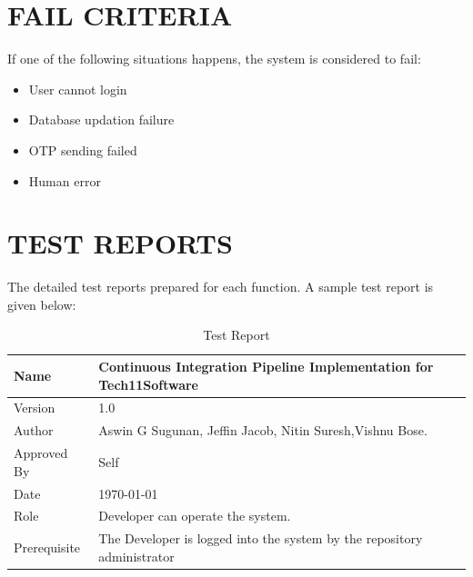 \documentclass[12pt,a4paper,oneside]{report}
\begin{document}
{\section{FAIL CRITERIA}
\par If one of the following situations happens, the system is considered to fail:
\begin{itemize}
\item	User cannot login
\item	Database updation failure
\item	OTP sending failed
\item	Human error
\end{itemize}
\section{TEST REPORTS}
The detailed test reports prepared for each function. A sample test report is given below:
\begin{table}[!htb]
\centering
\caption{Test Report}
\label{Test Report}
\begin{tabular}{|l|l|}
\hline
Name                                                                                & Continuous Integration Pipeline Implementation for Tech11Software                                               \\ \hline
Version                                                                             & 1.0                                                                  \\ \hline
Author                                                                              & Aswin G Sugunan, Jeffin Jacob, Nitin Suresh,Vishnu Bose.              \\ \hline
Approved By                                                                         & Self                                                                 \\ \hline
Date                                                                                & \today                                            \\ \hline
Role                                                                                & Developer can operate the system.                                          \\ \hline
Prerequisite                                                                        & The Developer is logged into the system by the repository administrator                                   \\ \hline

\end{tabular}
\end{table}}
\end{document}
